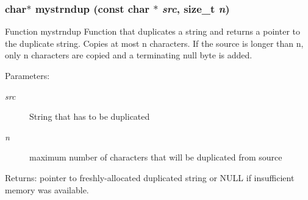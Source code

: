 \subsubsection{\setlength{\rightskip}{0pt plus 5cm}char$\ast$ mystrndup (const char $\ast$ {\em src}, size\_\-t {\em n})}\label{mystring_8c_384fa34f59b9f08fcc03ec781ffa83b0}


Function mystrndup Function that duplicates a string and returns a pointer to the duplicate string. Copies at most n characters. If the source is longer than n, only n characters are copied and a terminating null byte is added. \begin{Desc}
\item[Parameters:]
\begin{description}
\item[{\em src}]String that has to be duplicated \item[{\em n}]maximum number of characters that will be duplicated from source \end{description}
\end{Desc}
\begin{Desc}
\item[Returns:]pointer to freshly-allocated duplicated string or NULL if insufficient memory was available. \end{Desc}
